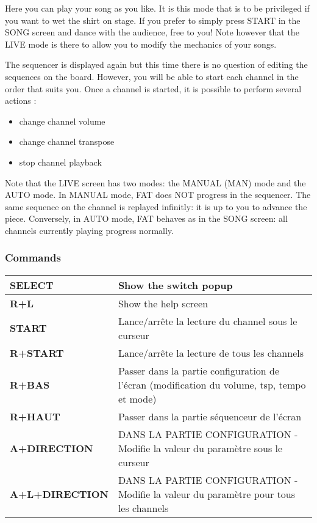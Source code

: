 Here you can play your song as you like.
It is this mode that is to be privileged if you want to wet the shirt on stage.
If you prefer to simply press START in the SONG screen and dance with the audience, free to you!
Note however that the LIVE mode is there to allow you to modify the mechanics of your songs.


The sequencer is displayed again but this time there is no question of editing the sequences on the board.
However, you will be able to start each channel in the order that suits you.
Once a channel is started, it is possible to perform several actions :
\medskip

\begin{itemize}
    \item{change channel volume}
    \item{change channel transpose}
    \item{stop channel playback}
\end{itemize}
\medskip

Note that the LIVE screen has two modes: the MANUAL (MAN) mode and the AUTO mode.
In MANUAL mode, FAT does NOT progress in the sequencer. The same sequence on the channel is replayed infinitly: it is up to you to advance the piece.
Conversely, in AUTO mode, FAT behaves as in the SONG screen: all channels currently playing progress normally.
\newpage %
\subsubsection{Commands}
\begin{supertabular}{|l|p{10cm}|}
    {\bf SELECT} & Show the switch popup \\
    \hline
    {\bf R+L} & Show the help screen \\
    \hline
    {\bf START} & Lance/arrête la lecture du channel sous le curseur \\
    \hline
    {\bf R+START} & Lance/arrête la lecture de tous les channels \\
    \hline
    {\bf R+BAS} & Passer dans la partie configuration de l'écran (modification du volume, tsp, tempo et mode) \\
    \hline
    {\bf R+HAUT} & Passer dans la partie séquenceur de l'écran \\
    \hline
    {\bf A+DIRECTION} & DANS LA PARTIE CONFIGURATION - Modifie la valeur du paramètre sous le curseur \\
    \hline
    {\bf A+L+DIRECTION} & DANS LA PARTIE CONFIGURATION - Modifie la valeur du paramètre pour tous les channels \\
\end{supertabular}

